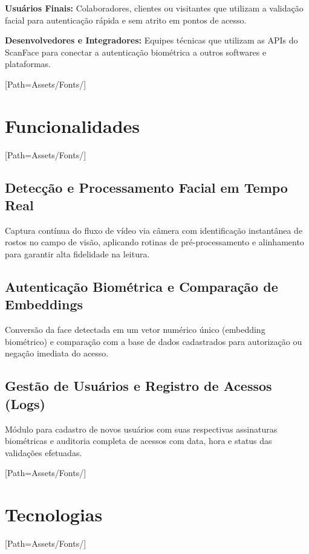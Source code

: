 \documentclass{article}
\begin{document}
\vspace{0.5cm}

\textbf{Usuários Finais:} Colaboradores, clientes ou visitantes que utilizam a validação facial para autenticação rápida e sem atrito em pontos de acesso.

\vspace{0.5cm}

\textbf{Desenvolvedores e Integradores:} Equipes técnicas que utilizam as APIs do ScanFace para conectar a autenticação biométrica a outros softwares e plataformas.
\newpage

\setmainfont{LEMONMILK-Bold.otf}[Path=Assets/Fonts/]
\section{Funcionalidades}
\setmainfont{LEMONMILK-Regular.otf}[Path=Assets/Fonts/]

\subsection{Detecção e Processamento Facial em Tempo Real}
Captura contínua do fluxo de vídeo via câmera com identificação instantânea de rostos no campo de visão, aplicando rotinas de pré-processamento e alinhamento para garantir alta fidelidade na leitura.

\vspace{0.3cm}

\subsection{Autenticação Biométrica e Comparação de Embeddings}
Conversão da face detectada em um vetor numérico único (embedding biométrico) e comparação com a base de dados cadastrados para autorização ou negação imediata do acesso.

\vspace{0.3cm}

\subsection{Gestão de Usuários e Registro de Acessos (Logs)}
Módulo para cadastro de novos usuários com suas respectivas assinaturas biométricas e auditoria completa de acessos com data, hora e status das validações efetuadas.
\newpage

\setmainfont{LEMONMILK-Bold.otf}[Path=Assets/Fonts/]
\section{Tecnologias}
\setmainfont{LEMONMILK-Regular.otf}[Path=Assets/Fonts/]
\end{document}
